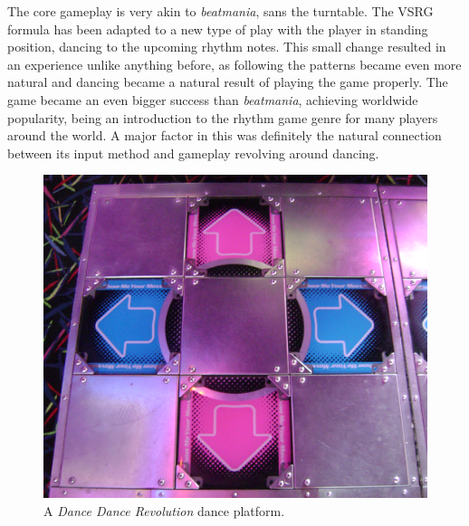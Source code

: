 The core gameplay is very akin to \textit{beatmania}, sans the turntable. The VSRG formula has been adapted to a new type of play with the player in standing position, dancing to the upcoming rhythm notes. This small change resulted in an experience unlike anything before, as following the patterns became even more natural and dancing became a natural result of playing the game properly. The game became an even bigger success than \textit{beatmania}, achieving worldwide popularity, being an introduction to the rhythm game genre for many players around the world. A major factor in this was definitely the natural connection between its input method and gameplay revolving around dancing.

\begin{figure}[h]
    \centering\includegraphics[scale=0.25]{obrazki/ddrplatform.png}
    \caption{A \textit{Dance Dance Revolution} dance platform. \cite{ddrplatform}}
    \label{fig:ddr_platform}
\end{figure}

